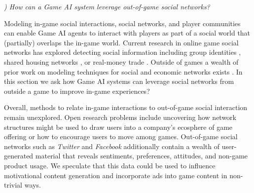 \documentclass[conference]{IEEEtran}
\newcounter{questionno}
\newcommand{\subsubsectionx}[1]{{\em {\arabic{questionno}) #1}}
	\addtocounter{questionno}{1}
	}
\begin{document}


\subsubsectionx{How can a Game AI system leverage out-of-game social networks?}
%
Modeling in-game social interactions, social networks, and player communities can enable Game AI agents to interact with players as part of a social world that (partially) overlaps the in-game world. 
Current research in online game social networks has explored detecting social information including group identities \cite{grappiolo2013:group-identification}, shared housing networks \cite{ahmad2011:goldmining-hypergraph}, or real-money trade \cite{fujita2011:rmt-detect}. 
Outside of games a wealth of prior work on modeling techniques for social and economic networks exists \cite{jackson2010:soc-econ-networks}.
In this section we ask how Game AI systems can leverage social networks from outside a game to improve in-game experiences?

Overall, methods to relate in-game interactions to out-of-game social interaction remain unexplored.
Open research problems include uncovering how network structures might be used to draw users into a company's ecosphere of game offering or how to encourage users to move among games.
Out-of-game social networks such as {\em Twitter} and {\em Facebook} additionally contain a wealth of user-generated material that reveals sentiments, preferences, attitudes, and non-game product usage.
We speculate that this data could be used to influence motivational content generation and incorporate ads into game content in non-trivial ways.
%
\end{document}
